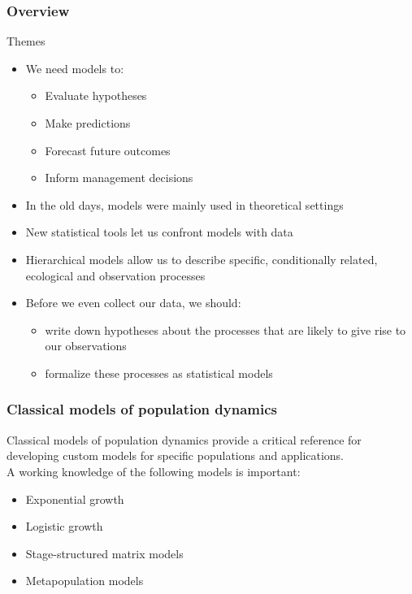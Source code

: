\documentclass{beamer}\usepackage[]{graphicx}\usepackage[]{color}
\begin{document}
\begin{frame}
  \frametitle{Overview}
  {\Large Themes}
  \begin{itemize}
    \item<1-| grayout@5-> We need models to:
      \begin{itemize}[<1-| grayout@5->]
        \item Evaluate hypotheses
        \item Make predictions
        \item Forecast future outcomes
        \item Inform management decisions
      \end{itemize}
    \item<2-| grayout@5-> In the old days, models were mainly used in theoretical settings
    \item<3-| grayout@5-> New statistical tools let us confront models with data
    \item<4-| grayout@5-> Hierarchical models allow us to describe specific,
      conditionally related, ecological and observation processes
    \item<5-> Before we even collect our data, we should:
      \begin{itemize}
        \item write down hypotheses about the processes that are likely to give 
          rise to our observations
        \item formalize these processes as statistical models
      \end{itemize}
  \end{itemize}
\end{frame}




\begin{frame}
  \frametitle{Classical models of population dynamics}
  Classical models of population dynamics provide a critical reference
  for developing custom models for specific populations and
  applications. \\
  \pause
  \vfill
  A working knowledge of the following models is important:
  \begin{itemize}
    \item Exponential growth
    \item Logistic growth
    \item Stage-structured matrix models
    \item Metapopulation models
  \end{itemize}
\end{frame}
\end{document}
